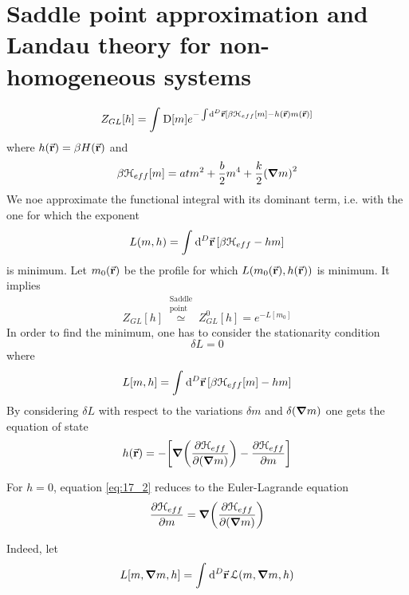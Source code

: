 \documentclass[../main/main.tex]{subfiles}
\begin{document}
\section{Saddle point approximation and Landau theory for non-homogeneous systems}
\begin{equation}
  Z_{GL}[h] = \int_{}^{} \text{D} [m] e^{- \int_{}^{} \dd[D]{\va{r}} \qty[\beta \mathcal{H}_{eff} [m] - h (\va{r}) m (\va{r})]   }
\end{equation}
where \( h(\va{r}) = \beta H(\va{r}) \) and
\begin{equation}
  \beta \mathcal{H}_{eff} [m] = a t m^2 + \frac{b}{2} m^4 + \frac{k}{2} \qty(\grad m)^2
\end{equation}
We noe approximate the functional integral with its dominant term, i.e. with the one for which the exponent
\begin{equation}
  L (m,h) = \int_{}^{} \dd[D]{\va{r}}  \qty[\beta \mathcal{H}_{eff} - h m]
\end{equation}
is minimum. Let \( m_0 (\va{r}) \) be the profile for which \( L (m_0 (\va{r}), h (\va{r}) ) \) is minimum. It implies
\begin{equation}
  Z_{GL} [h] \overset{\substack{ \text{Saddle} \\  \text{point} } }{\simeq } Z_{GL}^0 [h] = e^{- L [m_0]}
\end{equation}
In order to find the minimum, one has to consider the stationarity condition
\begin{equation}
  \delta L = 0
  \label{eq:17_3}
\end{equation}
where
\begin{equation}
  L [m,h] = \int_{}^{} \dd[D]{\va{r}} \qty[\beta \mathcal{H}_{eff} [m] - h m]
\end{equation}
By considering \( \delta L \) with respect to the variations \( \delta m \) and \( \delta (\grad m) \) one gets the equation of state
\begin{equation}
  h (\va{r}) = - \qty[\grad \qty(\pdv{ \mathcal{H}_{eff}}{(\grad m)} ) - \pdv{\mathcal{H}_{eff}}{m}  ]
  \label{eq:17_2}
\end{equation}
  \begin{remark}
  For \( h=0 \), equation \eqref{eq:17_2} reduces to the Euler-Lagrande equation
  \begin{equation}
    \pdv{\mathcal{H}_{eff}}{m} = \grad \qty(  \pdv{\mathcal{H}_{eff}}{(\grad m)})
  \end{equation}
  \end{remark}
Indeed, let
\begin{equation}
  L [m, \grad m,h] = \int_{}^{} \dd[D]{\va{r}} \mathcal{L} (m, \grad m,h)
\end{equation}
\end{document}
